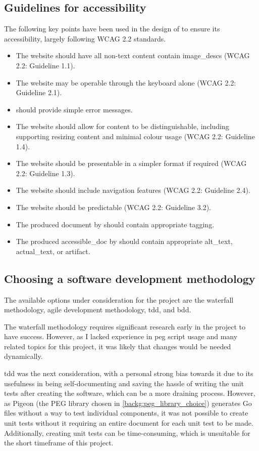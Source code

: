 \subsection{\nmu Guidelines \nmu for accessibility}\label{backg:accessibility_guidelines}
The following key points have been used in the design of \lintexspaced to ensure its accessibility, largely following WCAG 2.2 \parencite{wcag} standards.
\begin{itemize}
    \item The website should have all non-text content contain \glspl{image_desc} (WCAG 2.2: Guideline 1.1).
    \item The website may be operable through the keyboard alone (WCAG 2.2: Guideline 2.1).
    \item \lintexspaced should provide simple error messages.
    \item The website should allow for content to be distinguishable, including supporting resizing content and minimal colour usage (WCAG 2.2: Guideline 1.4).
    \item The website should be presentable in a simpler format if required (WCAG 2.2: Guideline 1.3).
    \item The website should include navigation features (WCAG 2.2: Guideline 2.4).
    \item The website should be predictable (WCAG 2.2: Guideline 3.2).
    \item The produced document by \lintexspaced should contain appropriate tagging.
    \item The produced \gls{accessible_doc} by \lintexspaced should contain appropriate \gls{alt_text}, \gls{actual_text}, or \gls{artifact}.
\end{itemize}

\subsection{Choosing a software development methodology}\label{backg:swe_methodology}
The available options under consideration for the project are the waterfall methodology, agile development methodology, \acrfull{tdd}, and \acrfull{bdd}.

The waterfall methodology requires significant research early in the project to have success. However, as I lacked experience in \acrshort{peg} script usage and many related topics for this project, it was likely that changes would be needed dynamically.

\Acrshort{tdd} was the next consideration, with a personal strong bias towards it due to its usefulness in being self-documenting and saving the hassle of writing the unit tests after creating the software, which can be a more draining process. However, as Pigeon (the PEG library chosen in \cref{backg:peg_library_choice}) generates Go files without a way to test individual components, it was not possible to create unit tests without it requiring an entire \latexspaced document for each unit test to be made. Additionally, creating unit tests can be time-consuming, which is unsuitable for the short timeframe of this project.

